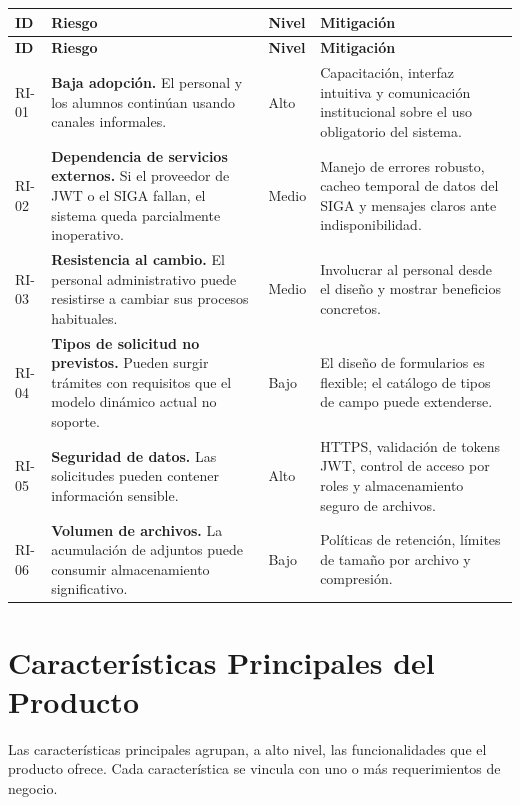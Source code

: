 \documentclass[12pt,letterpaper]{report}
\begin{document}
\begin{longtable}{|C{1.2cm}|L{5.5cm}|C{1.5cm}|L{5cm}|}
    \hline
    \textbf{ID} & \textbf{Riesgo} & \textbf{Nivel} & \textbf{Mitigación} \\
    \hline
    \endfirsthead
    \hline
    \textbf{ID} & \textbf{Riesgo} & \textbf{Nivel} & \textbf{Mitigación} \\
    \hline
    \endhead
    \hline
    \endfoot

    RI-01 & \textbf{Baja adopción.} El personal y los alumnos continúan usando canales informales. & Alto & Capacitación, interfaz intuitiva y comunicación institucional sobre el uso obligatorio del sistema. \\
    \hline
    RI-02 & \textbf{Dependencia de servicios externos.} Si el proveedor de JWT o el SIGA fallan, el sistema queda parcialmente inoperativo. & Medio & Manejo de errores robusto, cacheo temporal de datos del SIGA y mensajes claros ante indisponibilidad. \\
    \hline
    RI-03 & \textbf{Resistencia al cambio.} El personal administrativo puede resistirse a cambiar sus procesos habituales. & Medio & Involucrar al personal desde el diseño y mostrar beneficios concretos. \\
    \hline
    RI-04 & \textbf{Tipos de solicitud no previstos.} Pueden surgir trámites con requisitos que el modelo dinámico actual no soporte. & Bajo & El diseño de formularios es flexible; el catálogo de tipos de campo puede extenderse. \\
    \hline
    RI-05 & \textbf{Seguridad de datos.} Las solicitudes pueden contener información sensible. & Alto & HTTPS, validación de tokens JWT, control de acceso por roles y almacenamiento seguro de archivos. \\
    \hline
    RI-06 & \textbf{Volumen de archivos.} La acumulación de adjuntos puede consumir almacenamiento significativo. & Bajo & Políticas de retención, límites de tamaño por archivo y compresión. \\
    \hline
\end{longtable}

\chapter{Características Principales del Producto}

Las características principales agrupan, a alto nivel, las funcionalidades que el producto ofrece. Cada característica se vincula con uno o más requerimientos de negocio.
\end{document}
